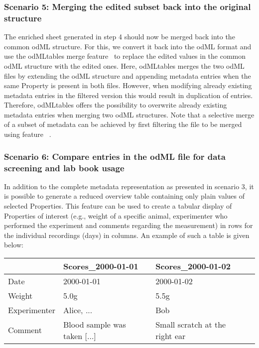{\subsubsection*{Scenario 5: Merging the edited subset back into the original structure}
The enriched  sheet generated in step 4 should now be merged back into the common odML structure. For this, we convert it back into the odML format and use the odMLtables merge feature \fmerge\ to replace the edited values in the common odML structure with the edited ones. Here, odMLtables merges the two odML files by extending the odML structure and appending metadata entries when the same Property is present in both files. However, when modifying already existing metadata entries in the filtered version this would result in duplication of entries. Therefore, odMLtables offers the possibility to overwrite already existing metadata entries when merging two odML structures. Note that a selective merge of a subset of metadata can be achieved by first filtering the file to be merged using feature \ffilter\ . 


\subsubsection*{Scenario 6: Compare entries in the odML file for data screening and lab book usage}
In addition to the complete metadata representation as presented in scenario 3, it is possible to generate a reduced overview table containing only plain values of selected Properties. This feature can be used to create a tabular display of Properties of interest (e.g., weight of a specific animal, experimenter who performed the experiment and comments regarding the measurement) in rows for the individual recordings (days) in columns. An example of such a table is given below:

\begin{center}
\begin{tabular}{|l||l|l|l|}
\hline
				 & Scores\_2000-01-01 & Scores\_2000-01-02\\
\hline
Date             &  2000-01-01 & 2000-01-02\\
\hline
Weight           &  5.0g & 5.5g\\
\hline
Experimenter     & Alice, ... & Bob\\
\hline
Comment  & Blood sample was taken [...] & Small scratch at the right ear \\
\hline
\end{tabular}
\end{center}

}
